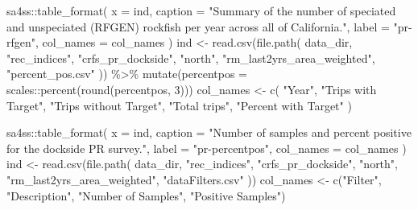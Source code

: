\documentclass[
  letterpaper,
]{article}
\newenvironment{Shaded}{\begin{snugshade}}{\end{snugshade}}
\newcommand{\AttributeTok}[1]{\textcolor[rgb]{0.77,0.63,0.00}{#1}}
\newcommand{\DecValTok}[1]{\textcolor[rgb]{0.00,0.00,0.81}{#1}}
\newcommand{\FunctionTok}[1]{\textcolor[rgb]{0.00,0.00,0.00}{#1}}
\newcommand{\NormalTok}[1]{#1}
\newcommand{\OtherTok}[1]{\textcolor[rgb]{0.56,0.35,0.01}{#1}}
\newcommand{\SpecialCharTok}[1]{\textcolor[rgb]{0.00,0.00,0.00}{#1}}
\newcommand{\StringTok}[1]{\textcolor[rgb]{0.31,0.60,0.02}{#1}}
\begin{document}
\begin{Shaded}
\begin{Highlighting}[]
\NormalTok{sa4ss}\SpecialCharTok{::}\FunctionTok{table\_format}\NormalTok{(}
  \AttributeTok{x =}\NormalTok{ ind,}
  \AttributeTok{caption =} \StringTok{"Summary of the number of speciated and unspeciated (RFGEN) rockfish }
\StringTok{  per year across all of California."}\NormalTok{,}
  \AttributeTok{label =} \StringTok{"pr{-}rfgen"}\NormalTok{,}
  \AttributeTok{col\_names =}\NormalTok{ col\_names}
\NormalTok{)}
\NormalTok{ind }\OtherTok{\textless{}{-}} \FunctionTok{read.csv}\NormalTok{(}\FunctionTok{file.path}\NormalTok{(}
\NormalTok{  data\_dir, }\StringTok{"rec\_indices"}\NormalTok{, }\StringTok{"crfs\_pr\_dockside"}\NormalTok{, }\StringTok{"north"}\NormalTok{,}
  \StringTok{"rm\_last2yrs\_area\_weighted"}\NormalTok{, }\StringTok{"percent\_pos.csv"}
\NormalTok{)) }\SpecialCharTok{\%\textgreater{}\%}
  \FunctionTok{mutate}\NormalTok{(}\AttributeTok{percentpos =}\NormalTok{ scales}\SpecialCharTok{::}\FunctionTok{percent}\NormalTok{(}\FunctionTok{round}\NormalTok{(percentpos, }\DecValTok{3}\NormalTok{)))}
\NormalTok{col\_names }\OtherTok{\textless{}{-}} \FunctionTok{c}\NormalTok{(}
  \StringTok{"Year"}\NormalTok{, }\StringTok{"Trips with Target"}\NormalTok{, }\StringTok{"Trips without Target"}\NormalTok{, }\StringTok{"Total trips"}\NormalTok{,}
  \StringTok{"Percent with Target"}
\NormalTok{)}

\NormalTok{sa4ss}\SpecialCharTok{::}\FunctionTok{table\_format}\NormalTok{(}
  \AttributeTok{x =}\NormalTok{ ind,}
  \AttributeTok{caption =} \StringTok{"Number of samples and percent positive for the dockside PR survey."}\NormalTok{,}
  \AttributeTok{label =} \StringTok{"pr{-}percentpos"}\NormalTok{,}
  \AttributeTok{col\_names =}\NormalTok{ col\_names}
\NormalTok{)}
\NormalTok{ind }\OtherTok{\textless{}{-}} \FunctionTok{read.csv}\NormalTok{(}\FunctionTok{file.path}\NormalTok{(}
\NormalTok{  data\_dir, }\StringTok{"rec\_indices"}\NormalTok{, }\StringTok{"crfs\_pr\_dockside"}\NormalTok{, }\StringTok{"north"}\NormalTok{,}
   \StringTok{"rm\_last2yrs\_area\_weighted"}\NormalTok{, }\StringTok{"dataFilters.csv"}
\NormalTok{))}
\NormalTok{col\_names }\OtherTok{\textless{}{-}} \FunctionTok{c}\NormalTok{(}\StringTok{"Filter"}\NormalTok{, }\StringTok{"Description"}\NormalTok{, }\StringTok{"Number of Samples"}\NormalTok{, }\StringTok{"Positive Samples"}\NormalTok{)}


\end{Highlighting}
\end{Shaded}
\end{document}

